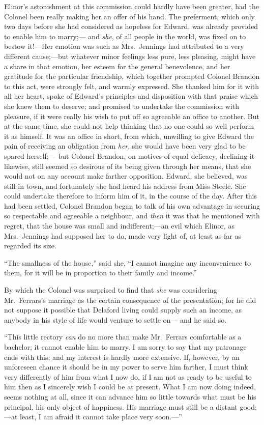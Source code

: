 \documentclass{article}
\begin{document}
Elinor's astonishment at this commission could
hardly have been greater, had the Colonel been really
making her an offer of his hand.  The preferment,
which only two days before she had considered as hopeless
for Edward, was already provided to enable him to marry;---%
and \emph{she}, of all people in the world, was fixed on to
bestow it!---Her emotion was such as Mrs.\ Jennings had
attributed to a very different cause;---but whatever minor
feelings less pure, less pleasing, might have a share
in that emotion, her esteem for the general benevolence,
and her gratitude for the particular friendship,
which together prompted Colonel Brandon to this act,
were strongly felt, and warmly expressed.  She thanked him
for it with all her heart, spoke of Edward's principles and
disposition with that praise which she knew them to deserve;
and promised to undertake the commission with pleasure,
if it were really his wish to put off so agreeable an office
to another.  But at the same time, she could not help
thinking that no one could so well perform it as himself.
It was an office in short, from which, unwilling to give
Edward the pain of receiving an obligation from \emph{her},
she would have been very glad to be spared herself;---%
but Colonel Brandon, on motives of equal delicacy,
declining it likewise, still seemed so desirous of its being
given through her means, that she would not on any account
make farther opposition.  Edward, she believed, was still in
town,
and fortunately she had heard his address from Miss Steele.
She could undertake therefore to inform him of it,
in the course of the day.  After this had been settled,
Colonel Brandon began to talk of his own advantage
in securing so respectable and agreeable a neighbour,
and \emph{then} it was that he mentioned with regret, that the
house was small and indifferent;---an evil which Elinor,
as Mrs.\ Jennings had supposed her to do, made very light of,
at least as far as regarded its size.

``The smallness of the house,'' said she,
``I cannot imagine any inconvenience to them,
for it will be in proportion to their family and income.''

By which the Colonel was surprised to find that \emph{she}
was considering Mr.\ Ferrars's marriage as the certain
consequence of the presentation; for he did not suppose it
possible that Delaford living could supply such an income,
as anybody in his style of life would venture to settle on---%
and he said so.

``This little rectory \emph{can} do no more than make Mr.\ Ferrars
comfortable as a bachelor; it cannot enable him to marry.
I am sorry to say that my patronage ends with this;
and my interest is hardly more extensive.  If, however,
by an unforeseen chance it should be in my power to serve
him farther, I must think very differently of him
from what I now do, if I am not as ready to be useful
to him then as I sincerely wish I could be at present.
What I am now doing indeed, seems nothing at all,
since it can advance him so little towards what must
be his principal, his only object of happiness.
His marriage must still be a distant good;---at least,
I am afraid it cannot take place very soon.---''
\end{document}

